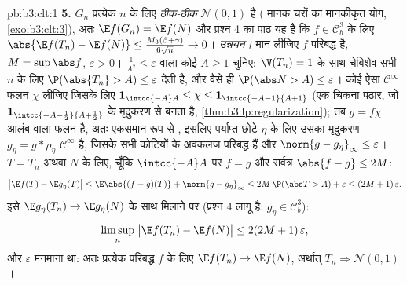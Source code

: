 \begin{solution}{pb:b3:clt:1}
\textbf{5.} $G_n$ प्रत्येक $n$ के लिए \emph{ठीक-ठीक}
$\mathcal N(0,1)$ है ( मानक  चरों का मानकीकृत
योग, \cref{exo:b3:clt:3}), अतः $\E f(G_n) = \E f(N)$ और
प्रश्न 4 का पाठ यह है कि $f \in
\mathcal C^3_b$ के लिए $\abs{\E f(T_n) - \E f(N)} \leq
\frac{M_3(\beta+\gamma)}{6\sqrt n} \to 0$। \emph{उन्नयन।}
मान लीजिए $f$ परिबद्ध  है, $M = \sup\abs f$,
$\varepsilon > 0$। $\frac1{A^2} \leq \varepsilon$ वाला कोई
$A \geq 1$ चुनिए: $\V(T_n) = 1$ के साथ चेबिशेव सभी $n$ के
लिए $\P(\abs{T_n} > A) \leq \varepsilon$ देती है, और वैसे ही
$\P(\abs N > A) \leq \varepsilon$। कोई ऐसा $\mathcal
C^\infty$ फलन $\chi$ लीजिए जिसके लिए
$\mathbf 1_{\intcc{-A}A} \leq \chi \leq
\mathbf 1_{\intcc{-A-1}{A+1}}$ (एक चिकना पठार, जो
$\mathbf 1_{\intcc{-A-\frac12}{A+\frac12}}$ के मृदुकरण से
बनता है, \cref{thm:b3:lp:regularization}); तब $g = f\chi$
 आलंब वाला  फलन है, अतः एकसमान रूप से , इसलिए
पर्याप्त छोटे $\eta$ के लिए उसका मृदुकरण $g_\eta = g *
\rho_\eta$ $\mathcal C^\infty$ है, जिसके सभी कोटियों के
अवकलज परिबद्ध हैं और $\norm{g - g_\eta}_\infty \leq
\varepsilon$। $T = T_n$ अथवा $N$ के लिए, चूँकि
$\intcc{-A}A$ पर $f = g$ और सर्वत्र $\abs{f - g} \leq 2M$:
\[
\bigl|\E f(T) - \E g_\eta(T)\bigr| \leq
\E\abs{(f - g)(T)} + \norm{g - g_\eta}_\infty
\leq 2M\,\P(\abs T > A) + \varepsilon \leq
(2M + 1)\,\varepsilon .
\]
इसे $\E g_\eta(T_n) \to \E g_\eta(N)$ के साथ मिलाने पर
(प्रश्न 4 लागू है: $g_\eta \in \mathcal C^3_b$):
\[
\limsup_n\;\bigl|\E f(T_n) - \E f(N)\bigr| \leq
2(2M + 1)\,\varepsilon ,
\]
और $\varepsilon$ मनमाना था: अतः प्रत्येक परिबद्ध  $f$ के
लिए $\E f(T_n) \to \E f(N)$, अर्थात् $T_n \Rightarrow
\mathcal N(0,1)$।


\end{solution}
